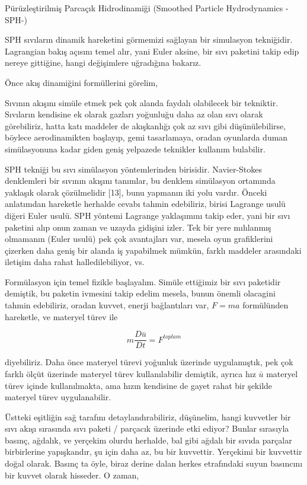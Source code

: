 \documentclass[12pt,fleqn]{article}\usepackage{../../common}
\begin{document}
Pürüzleştirilmiş Parcaçık Hidrodinamiği (Smoothed Particle Hydrodynamics -SPH-)

SPH sıvıların dinamik hareketini görmemizi sağlayan bir simulasyon
tekniğidir. Lagrangian bakış açısını temel alır, yani Euler aksine, bir sıvı
paketini takip edip nereye gittiğine, hangi değişimlere uğradığına
bakarız.

Önce akış dinamiğini formüllerini görelim,

Sıvının akışını simüle etmek pek çok alanda faydalı olabilecek bir
tekniktir. Sıvıların kendisine ek olarak gazları yoğunluğu daha az olan sıvı
olarak görebiliriz, hatta katı maddeler de akışkanlığı çok az sıvı gibi
düşünülebilirse, böylece aerodinamikten başlayıp, gemi tasarlamaya, oradan
oyunlarda duman simülasyonuna kadar giden geniş yelpazede teknikler kullanım
bulabilir.

SPH tekniği bu sıvı simülasyon yöntemlerinden birisidir. Navier-Stokes
denklemleri bir sıvının akışını tanımlar, bu denklem simülasyon ortamında
yaklaşık olarak çözülmelidir [13], bunu yapmanın iki yolu vardır. Önceki
anlatımdan hareketle herhalde cevabı tahmin edebiliriz, birisi Lagrange usulü
diğeri Euler usulü. SPH yöntemi Lagrange yaklaşımını takip eder, yani bir sıvı
paketini alıp onun zaman ve uzayda gidişini izler. Tek bir yere mıhlanmış
olmamanın (Euler usulü) pek çok avantajları var, mesela oyun grafiklerini
çizerken daha geniş bir alanda iş yapabilmek mümkün, farklı maddeler arasındaki
iletişim daha rahat halledilebiliyor, vs.

Formülasyon için temel fizikle başlayalım. Simüle ettiğimiz bir sıvı paketidir
demiştik, bu paketin ivmesini takip edelim mesela, bunun önemli olacagini tahmin
edebiliriz, oradan kuvvet, enerji bağlantıları var, $F=ma$ formülünden
hareketle, ve materyel türev ile

$$
m \frac{D \bar{u}}{D t} = F^{toplam}
$$

diyebiliriz. Daha önce materyel türevi yoğunluk üzerinde uygulamıştık, pek çok
farklı ölçüt üzerinde materyel türev kullanılabilir demiştik, ayrıca hız
$\bar{u}$ materyel türev içinde kullanılmakta, ama hızın kendisine de gayet
rahat bir şekilde materyel türev uygulanabilir.

Üstteki eşitliğin sağ tarafını detaylandırabiliriz, düşünelim, hangi kuvvetler
bir sıvı akışı sırasında sıvı paketi / parçacık üzerinde etki ediyor? Bunlar
sırasıyla basınç, ağdalık, ve yerçekim olurdu herhalde, bal gibi ağdalı bir
sıvıda parçalar birbirlerine yapışkandır, şu için daha az, bu bir
kuvvettir. Yerçekimi bir kuvvettir doğal olarak. Basınç ta öyle, biraz derine
dalan herkes etrafındaki suyun basıncını bir kuvvet olarak hisseder. O zaman,
\end{document}
